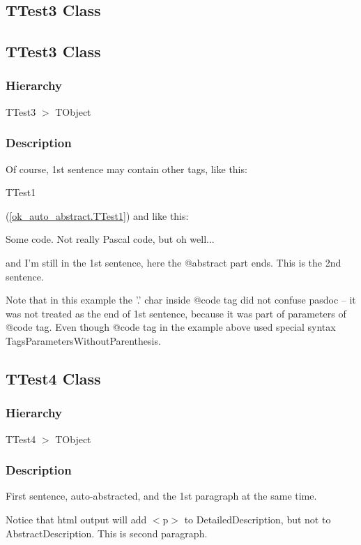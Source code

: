 \documentclass{report}
\newif\ifpdf
\begin{document}
\subsection*{\large{\textbf{TTest3 Class}}\normalsize\hspace{1ex}\hrulefill}
\else
\subsection*{TTest3 Class}
\fi
\label{ok_auto_abstract.TTest3}
\subsubsection*{\large{\textbf{Hierarchy}}\normalsize\hspace{1ex}\hfill}
TTest3 {$>$} TObject
\subsubsection*{\large{\textbf{Description}}\normalsize\hspace{1ex}\hfill}
Of course, 1st sentence may contain other tags, like this: \begin{ttfamily}TTest1\end{ttfamily}(\ref{ok_auto_abstract.TTest1}) and like this: \begin{ttfamily}Some code. Not really Pascal code, but oh well...\end{ttfamily} and I'm still in the 1st sentence, here the @abstract part ends. This is the 2nd sentence.

Note that in this example the '.' char inside @code tag did not confuse pasdoc -- it was not treated as the end of 1st sentence, because it was part of parameters of @code tag. Even though @code tag in the example above used special syntax TagsParametersWithoutParenthesis.\ifpdf
\subsection*{\large{\textbf{TTest4 Class}}\normalsize\hspace{1ex}\hrulefill}
\else
\subsection*{TTest4 Class}
\fi
\label{ok_auto_abstract.TTest4}
\subsubsection*{\large{\textbf{Hierarchy}}\normalsize\hspace{1ex}\hfill}
TTest4 {$>$} TObject
\subsubsection*{\large{\textbf{Description}}\normalsize\hspace{1ex}\hfill}
First sentence, auto{-}abstracted, and the 1st paragraph at the same time.

Notice that html output will add {$<$}p{$>$} to DetailedDescription, but not to AbstractDescription. This is second paragraph.
\end{document}
